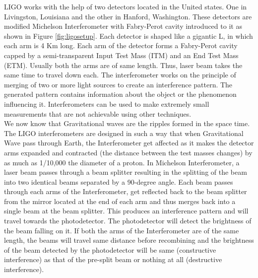 \documentclass[colorlinks=true,pdfstartview=FitV,linkcolor=blue,
            citecolor=red,urlcolor=magenta]{ligodoc}
\begin{document}
LIGO works with the help of two detectors located in the United states. One in Livingston, Louisiana and the other in Hanford, Washington. These detectors are modified Michelson Interferometer with Fabry-Perot cavity introduced to it as shown in Figure \ref{fig:ligosetup}. Each detector is shaped like a gigantic L, in which each arm is 4 Km long. Each arm of the detector forms a Fabry-Perot cavity capped by a semi-transparent Input Test Mass (ITM) and an End Test Mass (ETM). Usually both the arms are of same length. Thus, laser beam takes the same time to travel down each. The interferometer works on the principle of merging of two or more light sources to create an interference pattern. The generated pattern contains information about the object or the phenomenon influencing it. Interferometers can be used to make extremely small measurements that are not achievable using other techniques. 
\vspace{5mm}
\\We now know that Gravitational waves are the ripples formed in the space time. The LIGO interferometers are designed in such a way that when Gravitational Wave pass through Earth, the Interferometer get affected as it makes the detector arms expanded and contracted (the distance between the test masses changes) by as much as 1/10,000 the diameter of a proton.  In Michelson Interferometer, a laser beam passes through a beam splitter resulting in the splitting of the beam into two identical beams separated by a 90-degree angle. Each beam passes through each arms of the Interferometer, get reflected back to the beam splitter from the mirror located at the end of each arm and thus merges back into a single beam at the beam splitter. This produces an interference pattern and will travel towards the photodetector. The photodetector will detect the brightness of the beam falling on it. If both the arms of the Interferometer are of the same length, the beams will travel same distance before recombining and the brightness of the beam detected by the photodetector will be same (constructive interference) as that of the pre-split beam or nothing at all (destructive interference).
\vspace{5mm}
\end{document}

